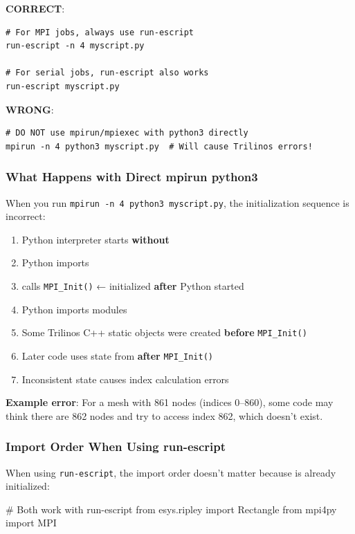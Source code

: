 \textbf{CORRECT}:
\begin{verbatim}
# For MPI jobs, always use run-escript
run-escript -n 4 myscript.py

# For serial jobs, run-escript also works
run-escript myscript.py
\end{verbatim}

\textbf{WRONG}:
\begin{verbatim}
# DO NOT use mpirun/mpiexec with python3 directly
mpirun -n 4 python3 myscript.py  # Will cause Trilinos errors!
\end{verbatim}

\subsubsection{What Happens with Direct mpirun python3}

When you run \texttt{mpirun -n 4 python3 myscript.py}, the initialization sequence is incorrect:

\begin{enumerate}
\item Python interpreter starts \textbf{without} \MPI
\item Python imports \mpifo
\item \mpifo calls \texttt{MPI\_Init()} ← \MPI initialized \textbf{after} Python started
\item Python imports \escript modules
\item Some Trilinos C++ static objects were created \textbf{before} \texttt{MPI\_Init()}
\item Later code uses \MPI state from \textbf{after} \texttt{MPI\_Init()}
\item Inconsistent state causes index calculation errors
\end{enumerate}

\textbf{Example error}: For a mesh with 861 nodes (indices 0--860), some code may think there are 862 nodes and try to access index 862, which doesn't exist.

\subsubsection{Import Order When Using run-escript}

When using \texttt{run-escript}, the import order doesn't matter because \MPI is already initialized:

\begin{python}
# Both work with run-escript
from esys.ripley import Rectangle
from mpi4py import MPI
\end{python}

